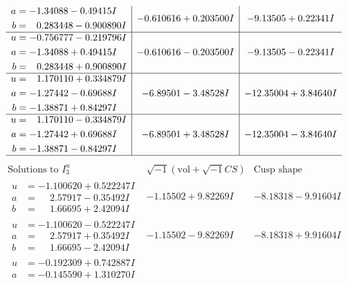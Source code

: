 \documentclass[1p]{elsarticle_modified}
\theoremstyle{definition}
\newcommand{\I}{\sqrt{-1}}
\begin{document}
$$\begin{array}{c|c|c}
\begin{aligned}
a &= -1.34088 - 0.49415 I \\
b &= \phantom{-}0.283448 - 0.900890 I\end{aligned}
 & -0.610616 + 0.203500 I & -9.13505 + 0.22341 I \\ \hline\begin{aligned}
u &= -0.756777 - 0.219796 I \\
a &= -1.34088 + 0.49415 I \\
b &= \phantom{-}0.283448 + 0.900890 I\end{aligned}
 & -0.610616 - 0.203500 I & -9.13505 - 0.22341 I \\ \hline\begin{aligned}
u &= \phantom{-}1.170110 + 0.334879 I \\
a &= -1.27442 - 0.69688 I \\
b &= -1.38871 + 0.84297 I\end{aligned}
 & -6.89501 - 3.48528 I & -12.35004 + 3.84640 I \\ \hline\begin{aligned}
u &= \phantom{-}1.170110 - 0.334879 I \\
a &= -1.27442 + 0.69688 I \\
b &= -1.38871 - 0.84297 I\end{aligned}
 & -6.89501 + 3.48528 I & -12.35004 - 3.84640 I\\
 \hline 
 \end{array}$$\newpage$$\begin{array}{c|c|c}  
\text{Solutions to }I^u_{3}& \I (\text{vol} + \sqrt{-1}CS) & \text{Cusp shape}\\
 \hline 
\begin{aligned}
u &= -1.100620 + 0.522247 I \\
a &= \phantom{-}2.57917 - 0.35492 I \\
b &= \phantom{-}1.66695 + 2.42094 I\end{aligned}
 & -1.15502 + 9.82269 I & -8.18318 - 9.91604 I \\ \hline\begin{aligned}
u &= -1.100620 - 0.522247 I \\
a &= \phantom{-}2.57917 + 0.35492 I \\
b &= \phantom{-}1.66695 - 2.42094 I\end{aligned}
 & -1.15502 - 9.82269 I & -8.18318 + 9.91604 I \\ \hline\begin{aligned}
u &= -0.192309 + 0.742887 I \\
a &= -0.145590 + 1.310270 I \\

\end{aligned}
\end{array}$$
\end{document}
